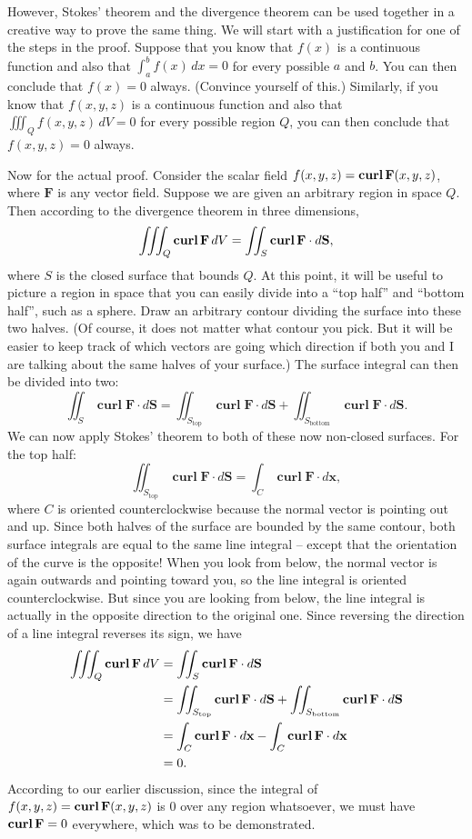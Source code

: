 \documentclass{myarticle}
\let\div\relax
\DeclareMathOperator{\div}{div}
\DeclareMathOperator{\curl}{\mathbf{curl}}
\renewcommand{\vec}[1]{\mathbf{#1}}
\theoremstyle{nospace}
\newtheorem{old series theorem}{Theorem}
\newenvironment{series theorem}{\begin{mdframed}\begin{old series theorem}}{\end{old series theorem}\end{mdframed}}
\begin{document}
However, Stokes' theorem and the divergence theorem can be used together in a creative way to prove the same thing. We will start with a justification for one of the steps in the proof. Suppose that you know that $f(x)$ is a continuous function and also that $\int_a^b f(x) \,dx = 0$ for every possible $a$ and $b$. You can then conclude that $f(x) = 0$ always. (Convince yourself of this.) Similarly, if you know that $f(x, y, z)$ is a continuous function and also that $\iiint_Q f(x, y, z) \,dV = 0$ for every possible region $Q$, you can then conclude that $f(x, y, z) = 0$ always.

Now for the actual proof. Consider the scalar field $f(x, y, z) = \div \curl \vec{F}(x, y, z)$, where $\vec{F}$ is any vector field. Suppose we are given an arbitrary region in space $Q$. Then according to the divergence theorem in three dimensions, \[ \iiint_Q \div \curl \vec{F} \,dV = \iint_S \curl \vec{F} \cdot d\vec{S}, \] where $S$ is the closed surface that bounds $Q$. At this point, it will be useful to picture a region in space that you can easily divide into a ``top half'' and ``bottom half'', such as a sphere. Draw an arbitrary contour dividing the surface into these two halves. (Of course, it does not matter what contour you pick. But it will be easier to keep track of which vectors are going which direction if both you and I are talking about the same halves of your surface.) The surface integral can then be divided into two: \[ \iint_S \curl \vec{F} \cdot d\vec{S} = \iint_{S_\text{top}} \curl \vec{F} \cdot d\vec{S} + \iint_{S_\text{bottom}} \curl \vec{F} \cdot d\vec{S}. \] We can now apply Stokes' theorem to both of these now non-closed surfaces. For the top half: \[ \iint_{S_\text{top}} \curl \vec{F} \cdot d\vec{S} = \int_C \curl \vec{F} \cdot d\vec{x}, \] where $C$ is oriented counterclockwise because the normal vector is pointing out and up. Since both halves of the surface are bounded by the same contour, both surface integrals are equal to the same line integral -- except that the orientation of the curve is the opposite! When you look from below, the normal vector is again outwards and pointing toward you, so the line integral is oriented counterclockwise. But since you are looking from below, the line integral is actually in the opposite direction to the original one. Since reversing the direction of a line integral reverses its sign, we have
\begin{align*}
\iiint_Q \div \curl \vec{F} \,dV &= \iint_S \curl \vec{F} \cdot d\vec{S} \\
&= \iint_{S_\text{top}} \curl \vec{F} \cdot d\vec{S} + \iint_{S_\text{bottom}} \curl \vec{F} \cdot d\vec{S} \\
&= \int_C \curl \vec{F} \cdot d\vec{x} - \int_C \curl \vec{F} \cdot d\vec{x} \\
&= 0.
\end{align*}
According to our earlier discussion, since the integral of $f(x, y, z) = \div \curl \vec{F}(x, y, z)$ is $0$ over any region whatsoever, we must have $\div \curl \vec{F} = 0$ everywhere, which was to be demonstrated.
\end{document}
